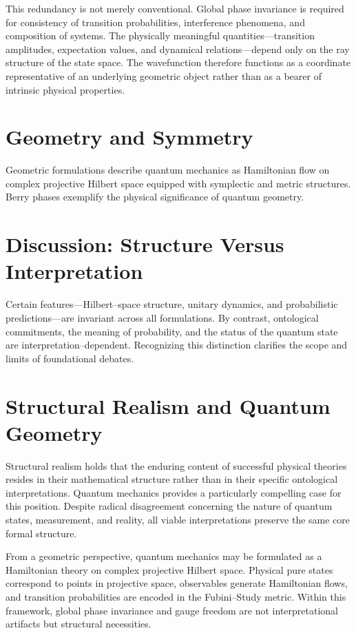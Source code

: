 \documentclass[11pt]{article}
\begin{document}
This redundancy is not merely conventional. Global phase invariance is required for consistency of transition probabilities, interference phenomena, and composition of systems. The physically meaningful quantities—transition amplitudes, expectation values, and dynamical relations—depend only on the ray structure of the state space. The wavefunction therefore functions as a coordinate representative of an underlying geometric object rather than as a bearer of intrinsic physical properties.

\section{Geometry and Symmetry}

Geometric formulations describe quantum mechanics as Hamiltonian flow on complex projective Hilbert space equipped with symplectic and metric structures. Berry phases exemplify the physical significance of quantum geometry.

\section{Discussion: Structure Versus Interpretation}

Certain features—Hilbert--space structure, unitary dynamics, and probabilistic predictions—are invariant across all formulations. By contrast, ontological commitments, the meaning of probability, and the status of the quantum state are interpretation--dependent. Recognizing this distinction clarifies the scope and limits of foundational debates.
\section{Structural Realism and Quantum Geometry}

Structural realism holds that the enduring content of successful physical theories resides in their mathematical structure rather than in their specific ontological interpretations. Quantum mechanics provides a particularly compelling case for this position. Despite radical disagreement concerning the nature of quantum states, measurement, and reality, all viable interpretations preserve the same core formal structure.

From a geometric perspective, quantum mechanics may be formulated as a Hamiltonian theory on complex projective Hilbert space. Physical pure states correspond to points in projective space, observables generate Hamiltonian flows, and transition probabilities are encoded in the Fubini--Study metric. Within this framework, global phase invariance and gauge freedom are not interpretational artifacts but structural necessities.
\end{document}
